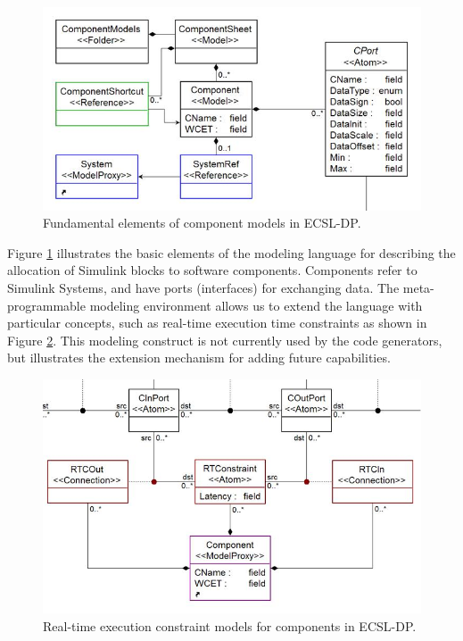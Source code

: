 \begin{figure}[h]
\begin{center}
   \includegraphics[width=0.9\columnwidth]{component_meta}
   \caption{Fundamental elements of component models in ECSL-DP.}
   \label{fig:CompMeta}
\end{center}
\end{figure}

Figure \ref{fig:CompMeta} illustrates the basic elements of the modeling language for describing the allocation of Simulink blocks to software components.   Components refer to Simulink Systems, and have ports (interfaces) for exchanging data.  The meta-programmable modeling environment allows us to extend the language with particular concepts, such as real-time execution time constraints as shown in Figure \ref{fig:RealTime}.  This modeling construct is not currently used by the code generators, but illustrates the extension mechanism for adding future capabilities.

\begin{figure}[h]
\begin{center}
   \includegraphics[width=0.9\columnwidth]{real_time}
   \caption{Real-time execution constraint models for components in ECSL-DP.}
   \label{fig:RealTime}
\end{center}
\end{figure}

